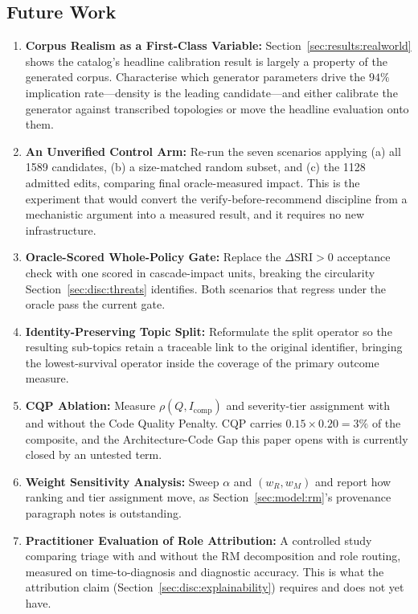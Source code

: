 \subsection{Future Work}
\label{sec:conclusion:future_work}

\begin{enumerate}
    \item \textbf{Corpus Realism as a First-Class Variable:} Section~\ref{sec:results:realworld} shows the catalog's headline calibration result is largely a property of the generated corpus. Characterise which generator parameters drive the $94\%$ implication rate---density is the leading candidate---and either calibrate the generator against transcribed topologies or move the headline evaluation onto them.
    \item \textbf{An Unverified Control Arm:} Re-run the seven scenarios applying (a) all 1589 candidates, (b) a size-matched random subset, and (c) the 1128 admitted edits, comparing final oracle-measured impact. This is the experiment that would convert the verify-before-recommend discipline from a mechanistic argument into a measured result, and it requires no new infrastructure.
    \item \textbf{Oracle-Scored Whole-Policy Gate:} Replace the $\Delta\mathrm{SRI} > 0$ acceptance check with one scored in cascade-impact units, breaking the circularity Section~\ref{sec:disc:threats} identifies. Both scenarios that regress under the oracle pass the current gate.
    \item \textbf{Identity-Preserving Topic Split:} Reformulate the split operator so the resulting sub-topics retain a traceable link to the original identifier, bringing the lowest-survival operator inside the coverage of the primary outcome measure.
    \item \textbf{CQP Ablation:} Measure $\rho(Q, I_{\text{comp}})$ and severity-tier assignment with and without the Code Quality Penalty. CQP carries $0.15 \times 0.20 = 3\%$ of the composite, and the Architecture-Code Gap this paper opens with is currently closed by an untested term.
    \item \textbf{Weight Sensitivity Analysis:} Sweep $\alpha$ and $(w_R, w_M)$ and report how ranking and tier assignment move, as Section~\ref{sec:model:rm}'s provenance paragraph notes is outstanding.
    \item \textbf{Practitioner Evaluation of Role Attribution:} A controlled study comparing triage with and without the RM decomposition and role routing, measured on time-to-diagnosis and diagnostic accuracy. This is what the attribution claim (Section~\ref{sec:disc:explainability}) requires and does not yet have.

\end{enumerate}
